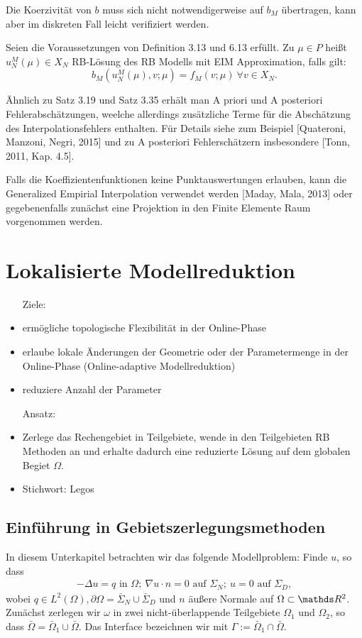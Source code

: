 Die Koerzivität von $b$ muss sich nicht notwendigerweise auf $b_M$ übertragen, kann aber im diskreten Fall leicht verifiziert werden.

Seien die Voraussetzungen von Definition 3.13 und 6.13 erfüllt.
Zu $\mu\in P$ heißt $u_N^M(\mu)\in X_N$ RB-Lösung des RB Modells mit EIM Approximation, falls gilt:
\[
b_M(u_N^M(\mu),v;\mu) = f_M(v;\mu)~\forall v\in X_N.
\]

Ähnlich zu Satz 3.19 und Satz 3.35 erhält man A priori und A posteriori Fehlerabschätzungen, weelche allerdings zusätzliche Terme für die Abschätzung des Interpolationsfehlers enthalten.
Für Details siehe zum Beispiel [Quateroni, Manzoni, Negri, 2015] und zu A posteriori Fehlerschätzern insbesondere [Tonn, 2011, Kap. 4.5].

Falls die Koeffizientenfunktionen keine Punktauswertungen erlauben, kann die Generalized Empirial Interpolation verwendet werden [Maday, Mala, 2013] oder gegebenenfalls zunächst eine Projektion in den Finite Elemente Raum vorgenommen werden.

\newpage
\section{Lokalisierte Modellreduktion}

\begin{itemize}
	\item[Ziele:]
	\item ermögliche topologische Flexibilität in der Online-Phase
	\item erlaube lokale Änderungen der Geometrie oder der Parametermenge in der Online-Phase (Online-adaptive Modellreduktion)
	\item reduziere Anzahl der Parameter
	\item[Ansatz:]
	\item Zerlege das Rechengebiet in Teilgebiete, wende in den Teilgebieten RB Methoden an und erhalte dadurch eine reduzierte Lösung auf dem globalen Begiet $\Omega$.
	\item Stichwort: Legos
\end{itemize}

\subsection{Einführung in Gebietszerlegungsmethoden}
In diesem Unterkapitel betrachten wir das folgende Modellproblem:
Finde $u$, so dass
\begin{align}
-\Delta u = q \text{ in }\Omega;~\nabla u\cdot n = 0 \text{ auf }\Sigma_N;~ u=0 \text{ auf } \Sigma_D,
\end{align}
wobei $q\in L^2(\Omega), \partial \Omega = \bar{\Sigma}_N \cup \bar{\Sigma}_D$ und $n$ äußere Normale auf $\Omega\subset \R^2$.
Zunächst zerlegen wir $\omega$ in zwei nicht-überlappende Teilgebiete $\Omega_1$ und $\Omega_2$, so dass $\bar{\Omega} = \bar{\Omega}_1 \cup \bar{\Omega}$.
Das Interface bezeichnen wir mit $\Gamma:= \bar{\Omega}_1 \cap \bar{\Omega}$.

